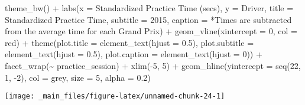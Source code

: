 \documentclass[
]{book}
\newenvironment{Shaded}{\begin{snugshade}}{\end{snugshade}}
\newcommand{\AttributeTok}[1]{\textcolor[rgb]{0.77,0.63,0.00}{#1}}
\newcommand{\DecValTok}[1]{\textcolor[rgb]{0.00,0.00,0.81}{#1}}
\newcommand{\FloatTok}[1]{\textcolor[rgb]{0.00,0.00,0.81}{#1}}
\newcommand{\FunctionTok}[1]{\textcolor[rgb]{0.00,0.00,0.00}{#1}}
\newcommand{\NormalTok}[1]{#1}
\newcommand{\SpecialCharTok}[1]{\textcolor[rgb]{0.00,0.00,0.00}{#1}}
\newcommand{\StringTok}[1]{\textcolor[rgb]{0.31,0.60,0.02}{#1}}
\begin{document}
\begin{Shaded}
\begin{Highlighting}[]
   \FunctionTok{theme\_bw}\NormalTok{() }\SpecialCharTok{+}
   \FunctionTok{labs}\NormalTok{(}\AttributeTok{x =} \StringTok{\textquotesingle{}Standardized Practice Time (secs)\textquotesingle{}}\NormalTok{,}
        \AttributeTok{y =} \StringTok{\textquotesingle{}Driver\textquotesingle{}}\NormalTok{,}
        \AttributeTok{title =} \StringTok{\textquotesingle{}Standardized Practice Time\textquotesingle{}}\NormalTok{,}
        \AttributeTok{subtitle =} \StringTok{\textquotesingle{}2015\textquotesingle{}}\NormalTok{,}
        \AttributeTok{caption =} \StringTok{\textquotesingle{}*Times are subtracted from the average time for each Grand Prix\textquotesingle{}}\NormalTok{) }\SpecialCharTok{+}
   \FunctionTok{geom\_vline}\NormalTok{(}\AttributeTok{xintercept =} \DecValTok{0}\NormalTok{, }\AttributeTok{col =} \StringTok{\textquotesingle{}red\textquotesingle{}}\NormalTok{) }\SpecialCharTok{+}
   \FunctionTok{theme}\NormalTok{(}\AttributeTok{plot.title =} \FunctionTok{element\_text}\NormalTok{(}\AttributeTok{hjust =} \FloatTok{0.5}\NormalTok{),}
         \AttributeTok{plot.subtitle =} \FunctionTok{element\_text}\NormalTok{(}\AttributeTok{hjust =} \FloatTok{0.5}\NormalTok{),}
         \AttributeTok{plot.caption =} \FunctionTok{element\_text}\NormalTok{(}\AttributeTok{hjust =} \DecValTok{0}\NormalTok{)) }\SpecialCharTok{+}
  \FunctionTok{facet\_wrap}\NormalTok{(}\SpecialCharTok{\textasciitilde{}}\NormalTok{ practice\_session) }\SpecialCharTok{+}
  \FunctionTok{xlim}\NormalTok{(}\SpecialCharTok{{-}}\DecValTok{5}\NormalTok{, }\DecValTok{5}\NormalTok{) }\SpecialCharTok{+}
  \FunctionTok{geom\_hline}\NormalTok{(}\AttributeTok{yintercept =} \FunctionTok{seq}\NormalTok{(}\DecValTok{22}\NormalTok{, }\DecValTok{1}\NormalTok{, }\SpecialCharTok{{-}}\DecValTok{2}\NormalTok{), }\AttributeTok{col =} \StringTok{\textquotesingle{}grey\textquotesingle{}}\NormalTok{, }\AttributeTok{size =} \DecValTok{5}\NormalTok{, }\AttributeTok{alpha =}  \FloatTok{0.2}\NormalTok{)}
\end{Highlighting}
\end{Shaded}

\begin{center}\texttt{[image: \_main\_files/figure-latex/unnamed-chunk-24-1]} \end{center}
\end{document}
